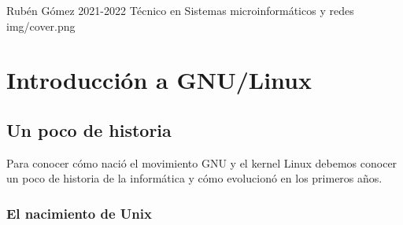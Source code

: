 \documentclass{../../../yukibook.cls/yukibook}
\begin{document}
  {Rubén Gómez}  %
  {2021-2022}    %
  {Técnico en Sistemas microinformáticos y redes} %
  {}	%
  {}	%
  {img/cover.png}



\chapter{Introducción a GNU/Linux}
\section{Un poco de historia}
Para conocer cómo nació el movimiento GNU y el kernel Linux debemos conocer un poco de historia de la informática y cómo evolucionó en los primeros años.

\subsection{El nacimiento de Unix}
\end{document}
